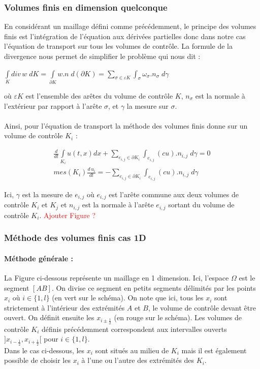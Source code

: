 \documentclass[12pt]{article}
\begin{document}
\subsubsection{Volumes finis en dimension quelconque}
\noindent En considérant un maillage défini comme précédemment, le principe des volumes finis est l'intégration de l'équation aux dérivées partielles donc dans notre cas l'équation de transport sur tous les volumes de contrôle. 
La formule de la divergence nous permet de simplifier le problème qui nous dit :
\\
\begin{center}
    $\displaystyle\int\limits_{K} div\, w \; dK=\int\limits_{\partial{K}} w.n \; d(\partial{K}) = \displaystyle\sum_{\sigma \in \varepsilon{K}} \int_{\sigma} \omega_{\sigma}.n_{\sigma} \; d\gamma$
\end{center}
où $\varepsilon K$ est l'ensemble des arêtes du volume de contrôle $K$, $n_{\sigma}$ est la normale à l'extérieur par rapport à l'arête $\sigma$, et $\gamma$ la mesure sur $\sigma$.
\\
\\Ainsi, pour l'équation de transport la méthode des volumes finis donne sur un volume de contrôle $K_i$ :

\begin{eqnarray}
       \frac{d}{dt} \int\limits_{K_i} u(t,x)dx + \displaystyle \sum_{e_{i,j}\in \partial K_i} \int_{e_{i,j}} (cu).{n_{i,j}} \; d\gamma=0
       \\mes(K_i)\frac{d\,u_i}{dt}=-\displaystyle\sum_{e_{i,j}\in \partial K_i} \int_{e_{i,j}} (cu).{n_{i,j}} \; d\gamma
\end{eqnarray}

\noindent Ici, $\gamma$ est la mesure de $e_{i,j}$ où $e_{i,j}$ est l'arête commune aux deux volumes de contrôle $K_i$ et $K_j$ et $n_{i,j}$ est la normale à l'arête $e_{i,j}$ sortant du volume de contrôle $K_i$. 
\textcolor{red}{Ajouter Figure ?}

\subsubsection{Méthode des volumes finis cas 1D }
\paragraph{Méthode générale :}
La Figure ci-dessous représente un maillage en 1 dimension. Ici, l'espace $\Omega$ est le segment $[AB]$. On divise ce segment en petits segments délimités par les points $x_i$ où $i\in \{1,l\}$ (en vert sur le schéma). On note que ici, tous les $x_i$ sont strictement à l'intérieur des extrémités $A$ et $B$, le volume de contrôle devant être ouvert. On définit ensuite les $x_{i\pm\frac{1}{2}}$ (en rouge sur le schéma). Les volumes de contrôle $K_i$ définis précédemment correspondent aux intervalles ouverts $]x_{i-\frac{1}{2}},x_{i+\frac{1}{2}}[$ pour $i\in \{1,l\}$.
\\Dans le cas ci-dessous, les $x_i$ sont situés au milieu de $K_i$ mais il est également possible de choisir les $x_i$ à l'une ou l'autre des extrémités des $K_i$. 
\end{document}
